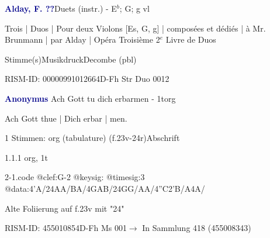 \documentclass[twocolumn]{book}
\begin{document}
\par \vspace{7pt} \textcolor{darkblue}{\textbf{Alday, F.  ??}}\hfillplus{\textbf{[1]}}\newline Duets (instr.) - E$^b$; G; g vl
\par \begin{itshape}Trois | Duos | Pour deux Violons [Es, G, g] | composées et dédiés | à Mr. Brunmann | par Alday | Opéra Troisième 2$^e$ Livre de Duos\end{itshape} 
\par \textcolor{darkblue}{}  Stimme(s)\newline Musikdruck\newline Decombe  (pbl)
\par RISM-ID: 00000991012664\newline D-Fh  Str Duo 0012
\par \vspace{7pt} \textcolor{darkblue}{\textbf{Anonymus  }}\hfillplus{\textbf{[2]}}\newline Ach Gott tu dich erbarmen - 1t\newline org
\par \begin{itshape}[f.23v, at left:] Ach Gott thue | Dich erbar | men.\end{itshape} 
\par \textcolor{darkblue}{}  1 Stimmen: org (tabulature)  (f.23v-24r)\newline Abschrift
\par 1.1.1  org, 1t  
\begin{filecontents*}{2-1.code}
@clef:G-2
@keysig:
@timesig:3
@data:4'A/24AA/BA/4GAB/24GG/AA/4''C2'B/A4A/
\end{filecontents*}
\newline
%
\par Alte Foliierung auf f.23v mit "24"
\par RISM-ID: 455010854\newline D-Fh  Ms 001\newline $\rightarrow$ In Sammlung 418 (455008343)
      
\end{document}
